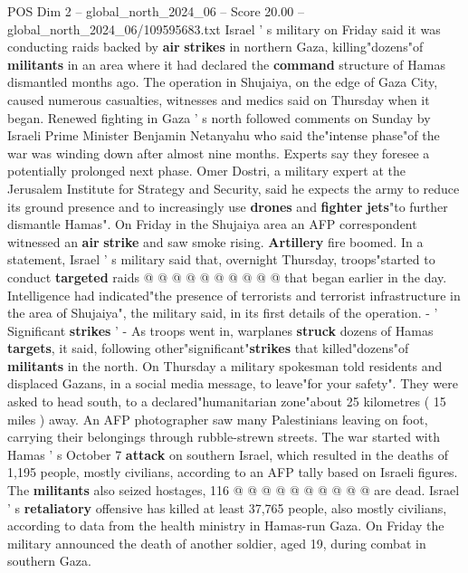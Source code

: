 \begin{textsample}{POS Dim 2 – global\_north\_2024\_06 – Score 20.00 – global\_north\_2024\_06/109595683.txt}  \label{ex:f2_pos_316}
Israel ' s military on Friday said it was conducting raids backed by \textbf{air} \textbf{strikes} in northern Gaza, killing"dozens"of \textbf{militants} in an area where it had declared the \textbf{command} structure of Hamas dismantled months ago.
The operation in Shujaiya, on the edge of Gaza City, caused numerous casualties, witnesses and medics said on Thursday when it began.
Renewed fighting in Gaza ' s north followed comments on Sunday by Israeli Prime Minister Benjamin Netanyahu who said the"intense phase"of the war was winding down after almost nine months.
Experts say they foresee a potentially prolonged next phase.
Omer Dostri, a military expert at the Jerusalem Institute for Strategy and Security, said he expects the army to reduce its ground presence and to increasingly use \textbf{drones} and \textbf{fighter} \textbf{jets}"to further dismantle Hamas".
On Friday in the Shujaiya area an AFP correspondent witnessed an \textbf{air} \textbf{strike} and saw smoke rising. \textbf{Artillery} fire boomed.
In a statement, Israel ' s military said that, overnight Thursday, troops"started to conduct \textbf{targeted} raids @ @ @ @ @ @ @ @ @ @ that began earlier in the day.
Intelligence had indicated"the presence of terrorists and terrorist infrastructure in the area of Shujaiya", the military said, in its first details of the operation. - ' Significant \textbf{strikes} ' - As troops went in, warplanes \textbf{struck} dozens of Hamas \textbf{targets}, it said, following other"significant"\textbf{strikes} that killed"dozens"of \textbf{militants} in the north.
On Thursday a military spokesman told residents and displaced Gazans, in a social media message, to leave"for your safety".
They were asked to head south, to a declared"humanitarian zone"about 25 kilometres ( 15 miles ) away.
An AFP photographer saw many Palestinians leaving on foot, carrying their belongings through rubble-strewn streets.
The war started with Hamas ' s October 7 \textbf{attack} on southern Israel, which resulted in the deaths of 1,195 people, mostly civilians, according to an AFP tally based on Israeli figures.
The \textbf{militants} also seized hostages, 116 @ @ @ @ @ @ @ @ @ @ are dead.
Israel ' s \textbf{retaliatory} offensive has killed at least 37,765 people, also mostly civilians, according to data from the health ministry in Hamas-run Gaza.
On Friday the military announced the death of another soldier, aged 19, during combat in southern Gaza.

\end{textsample}

